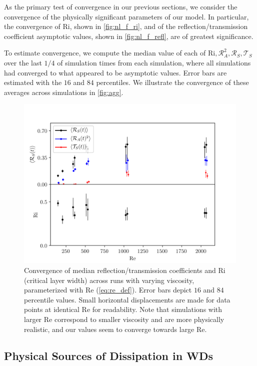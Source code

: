 \documentclass[
        fleqn,
        usenatbib,
    ]{mnras}
\begin{document}
As the primary test of convergence in our previous sections, we consider the
convergence of the physically significant parameters of our model. In
particular, the convergence of $\mathrm{Ri}$, shown in \autoref{fig:nl_f_ri},
and of the reflection/transmission coefficient asymptotic values, shown in
\autoref{fig:nl_f_refl}, are of greatest significance.

To estimate convergence, we compute the median value of each of $\mathrm{Ri},
\mathcal{R}_A^2, \mathcal{R}_S, \mathcal{T}_S$ over the last $1/4$ of simulation
times from each simulation, where all simulations had converged to what appeared
to be asymptotic values. Error bars are estimated with the $16$ and $84$
percentiles. We illustrate the convergence of these averages across simulations
in \autoref{fig:agg}.
\begin{figure}[t]
    \centering
    \includegraphics[width=\columnwidth]{plots/agg.png}
    \caption{Convergence of median reflection/transmission coefficients and
    $\mathrm{Ri}$ (critical layer width) across runs with varying viscosity,
    parameterized with $\mathrm{Re}$ (\autoref{eq:re_def}). Error bars depict
    $16$ and $84$ percentile values. Small horizontal displacements are made for
    data points at identical $\mathrm{Re}$ for readability. Note that
    simulations with larger $\mathrm{Re}$ correspond to smaller viscosity and
    are more physically realistic, and our values seem to converge towards large
    $\mathrm{Re}$.}\label{fig:agg}
\end{figure}

\subsection{Physical Sources of Dissipation in WDs}\label{ss:disp}
\end{document}

